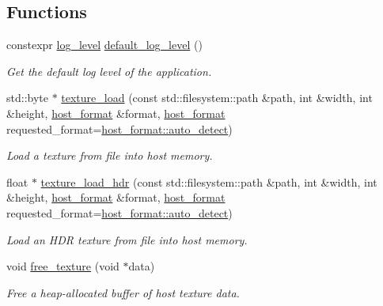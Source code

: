 \subsection*{Functions}
\begin{DoxyCompactItemize}
\item 
constexpr \mbox{\hyperlink{namespacemoka_a7c4111664aee7737c54ab37376b2637d}{log\+\_\+level}} \mbox{\hyperlink{namespacemoka_ac3f7b72250cd352011df4f431c862df5}{default\+\_\+log\+\_\+level}} ()
\begin{DoxyCompactList}\small\item\em Get the default log level of the application. \end{DoxyCompactList}\item 
std\+::byte $\ast$ \mbox{\hyperlink{namespacemoka_ad4baf5eb8971d3d74d1c21401ef1b162}{texture\+\_\+load}} (const std\+::filesystem\+::path \&path, int \&width, int \&height, \mbox{\hyperlink{namespacemoka_a1989c05aecf3bb10bbf8a7027e3df130}{host\+\_\+format}} \&format, \mbox{\hyperlink{namespacemoka_a1989c05aecf3bb10bbf8a7027e3df130}{host\+\_\+format}} requested\+\_\+format=\mbox{\hyperlink{namespacemoka_a1989c05aecf3bb10bbf8a7027e3df130a60db33599fbe80f2d536ce9ffb5f2377}{host\+\_\+format\+::auto\+\_\+detect}})
\begin{DoxyCompactList}\small\item\em Load a texture from file into host memory. \end{DoxyCompactList}\item 
float $\ast$ \mbox{\hyperlink{namespacemoka_a864278a703e7cae586ff56bf2dc4d57d}{texture\+\_\+load\+\_\+hdr}} (const std\+::filesystem\+::path \&path, int \&width, int \&height, \mbox{\hyperlink{namespacemoka_a1989c05aecf3bb10bbf8a7027e3df130}{host\+\_\+format}} \&format, \mbox{\hyperlink{namespacemoka_a1989c05aecf3bb10bbf8a7027e3df130}{host\+\_\+format}} requested\+\_\+format=\mbox{\hyperlink{namespacemoka_a1989c05aecf3bb10bbf8a7027e3df130a60db33599fbe80f2d536ce9ffb5f2377}{host\+\_\+format\+::auto\+\_\+detect}})
\begin{DoxyCompactList}\small\item\em Load an H\+DR texture from file into host memory. \end{DoxyCompactList}\item 
void \mbox{\hyperlink{namespacemoka_a6c4641e3deed82e275bcd034dfd4c09a}{free\+\_\+texture}} (void $\ast$data)
\begin{DoxyCompactList}\small\item\em Free a heap-\/allocated buffer of host texture data. \end{DoxyCompactList}\item 

\end{DoxyCompactItemize}
